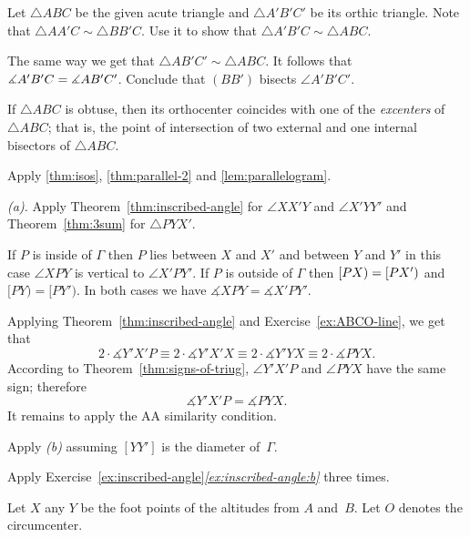 Let $\triangle ABC$ be the given acute triangle and $\triangle A'B'C'$ 
be its orthic triangle.
Note that $\triangle AA'C\sim\triangle BB'C$.
Use it to show that $\triangle A'B'C\sim \triangle ABC$.

The same way we get that $\triangle AB'C'\sim \triangle ABC$.
It follows that $\measuredangle A'B'C\z=\measuredangle AB'C'$.
Conclude that $(BB')$ bisects $\angle A'B'C'$.

If $\triangle ABC$ is obtuse, then its orthocenter coincides with one of the \emph{excenters} of $\triangle ABC$;
that is, 
the point of intersection of two external and one internal bisectors of $\triangle ABC$.
 
 Apply \ref{thm:isos}, \ref{thm:parallel-2} 
and \ref{lem:parallelogram}.

\setcounter{eqtn}{0}

 \textit{(a).}
Apply Theorem~\ref{thm:inscribed-angle} for $\angle XX'Y$ and $\angle X'YY'$
and Theorem~\ref{thm:3sum} for $\triangle PYX'$.

 If $P$ is inside of $\Gamma$ then $P$ lies between $X$ and $X'$ and between $Y$ and $Y'$ in this case $\angle XPY$ is vertical to $\angle X'PY'$.
If $P$ is outside of $\Gamma$ then $[PX)\z=[PX')$ and $[PY)=[PY')$.
In both cases we have $\measuredangle XPY=\measuredangle X'PY'$.

Applying Theorem~\ref{thm:inscribed-angle} and Exercise~\ref{ex:ABCO-line}, we get that
\[2\cdot \measuredangle Y'X'P
\equiv
2\cdot \measuredangle Y'X'X 
\equiv
2\cdot\measuredangle Y'YX
\equiv
2\cdot\measuredangle PYX.\]
According to Theorem~\ref{thm:signs-of-triug}, $\angle Y'X'P$ and $\angle PYX$ have the same sign;
therefore
$$\measuredangle Y'X'P= \measuredangle PYX.$$
It remains to apply the AA similarity condition.

 Apply \textit{(b)} assuming $[YY']$ is the diameter of~$\Gamma$. 

 Apply Exercise~\ref{ex:inscribed-angle}\textit{\ref{ex:inscribed-angle:b}}
three times.

Let $X$ any $Y$ be the foot points of the altitudes from $A$ and~$B$.
Let $O$ denotes the circumcenter.
 
